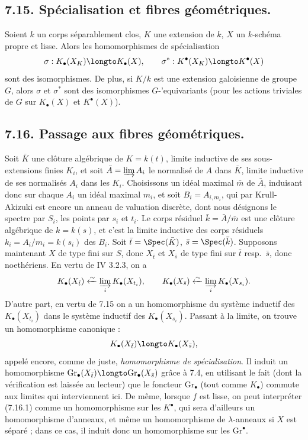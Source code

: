\subsection*{7.15. Sp\'ecialisation et fibres g\'eom\'etriques.}

Soient $k$ un corps s\'eparablement clos, $K$ une extension de $k$, $X$ un $k$-sch\'ema propre et lisse. Alors les homomorphismes de sp\'ecialisation
\[
\sigma : K_{\bullet}(X_{K}) \longto K_{\bullet}(X), \qquad \sigma^{*} : K^{\bullet}(X_{K}) \longto K^{\bullet}(X)
\]
sont des isomorphismes. De plus, si $K/k$ est une extension galoisienne de groupe $G$, alors $\sigma$ et $\sigma^{*}$ sont des isomorphismes $G$-'equivariants (pour les actions triviales de $G$ sur $K_{\bullet}(X)$ et $K^{\bullet}(X)$).

\subsection*{7.16. Passage aux fibres g\'eom\'etriques.}

Soit $\bar{K}$ une cl\^oture alg\'ebrique de $K = k(t)$, limite inductive de ses sous-extensions finies $K_{i}$, et soit $\bar{A} = \varinjlim A_{i}$ le normalis\'e de $A$ dans $\bar{K}$, limite inductive de ses normalis\'es $A_{i}$ dans les $K_{i}$. Choisissons un id\'eal maximal $\bar{m}$ de $\bar{A}$, induisant donc sur chaque $A_{i}$ un id\'eal maximal $m_{i}$, et soit $B_{i} = A_{i, m_{i}}$, qui par Krull-Akizuki est encore un anneau de valuation discr\`ete, dont nous d\'esignons le spectre par $S_{i}$, les points par $s_{i}$ et $t_{i}$. Le corps r\'esiduel $\bar{k} = \bar{A}/\bar{m}$ est une cl\^oture alg\'ebrique de $k = k(s)$, et c'est la limite inductive des corps r\'esiduels $k_{i} = A_{i}/m_{i} = k(s_{i})$ des $B_{i}$. Soit $\bar{t} = \Spec(\bar{K})$, $\bar{s} = \Spec(\bar{k})$. Supposons maintenant $X$ de type fini sur $S$, donc $X_{\bar{t}}$ et $X_{\bar{s}}$ de type fini sur $\bar{t}$ resp.\ $\bar{s}$, donc noeth\'eriens. En vertu de IV 3.2.3, on a
\[
K_{\bullet}(X_{\bar{t}}) \xleftarrow{\sim} \varinjlim_{i} K_{\bullet}(X_{t_{i}}), \qquad K_{\bullet}(X_{\bar{s}}) \xleftarrow{\sim} \varinjlim_{i} K_{\bullet}(X_{s_{i}}).
\]
D'autre part, en vertu de 7.15 on a un homomorphisme du syst\`eme inductif des $K_{\bullet}(X_{t_{i}})$ dans le syst\`eme inductif des $K_{\bullet}(X_{s_{i}})$. Passant \`a la limite, on trouve un homomorphisme canonique :
\begin{equation}\label{eq:7.16.1}
K_{\bullet}(X_{\bar{t}}) \longto K_{\bullet}(X_{\bar{s}}),
\end{equation}
appel\'e encore, comme de juste, \emph{homomorphisme de sp\'ecialisation}. Il induit un homomorphisme $\mathrm{Gr}_{\bullet}(X_{\bar{t}}) \longto \mathrm{Gr}_{\bullet}(X_{\bar{s}})$ gr\^ace \`a 7.4, en utilisant le fait (dont la v\'erification est laiss\'ee au lecteur) que le foncteur $\mathrm{Gr}_{\bullet}$ (tout comme $K_{\bullet}$) commute aux limites qui interviennent ici. De m\^eme, lorsque $f$ est lisse, on peut interpr\'eter (7.16.1) comme un homomorphisme sur les $K^{\bullet}$, qui sera d'ailleurs un homomorphisme d'anneaux, et m\^eme un homomorphisme de $\lambda$-anneaux si $X$ est s\'epar\'e ; dans ce cas, il induit donc un homomorphisme sur les $\mathrm{Gr}^{\bullet}$.

